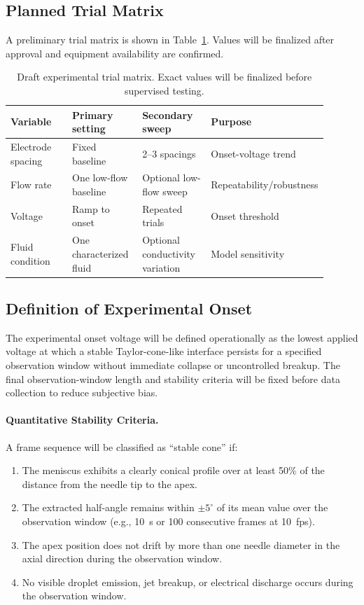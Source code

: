 \subsection{Planned Trial Matrix}

A preliminary trial matrix is shown in Table~\ref{tab:trial-matrix}. Values will be finalized after approval and equipment availability are confirmed.

\begin{table}[H]
\centering
\caption{Draft experimental trial matrix. Exact values will be finalized before supervised testing.}
\label{tab:trial-matrix}
\small
\begin{tabular}{p{0.22\linewidth}p{0.23\linewidth}p{0.23\linewidth}p{0.22\linewidth}}
\toprule
Variable & Primary setting & Secondary sweep & Purpose \\
\midrule
Electrode spacing & Fixed baseline & 2--3 spacings & Onset-voltage trend \\
Flow rate & One low-flow baseline & Optional low-flow sweep & Repeatability/robustness \\
Voltage & Ramp to onset & Repeated trials & Onset threshold \\
Fluid condition & One characterized fluid & Optional conductivity variation & Model sensitivity \\
\bottomrule
\end{tabular}
\end{table}

\subsection{Definition of Experimental Onset}

The experimental onset voltage will be defined operationally as the lowest applied voltage at which a stable Taylor-cone-like interface persists for a specified observation window without immediate collapse or uncontrolled breakup. The final observation-window length and stability criteria will be fixed before data collection to reduce subjective bias.

\paragraph{Quantitative Stability Criteria.} A frame sequence will be classified as ``stable cone'' if:
\begin{enumerate}
    \item The meniscus exhibits a clearly conical profile over at least 50\% of the distance from the needle tip to the apex.
    \item The extracted half-angle remains within $\pm 5^{\circ}$ of its mean value over the observation window (e.g., 10~s or 100 consecutive frames at 10~fps).
    \item The apex position does not drift by more than one needle diameter in the axial direction during the observation window.
    \item No visible droplet emission, jet breakup, or electrical discharge occurs during the observation window.
\end{enumerate}

